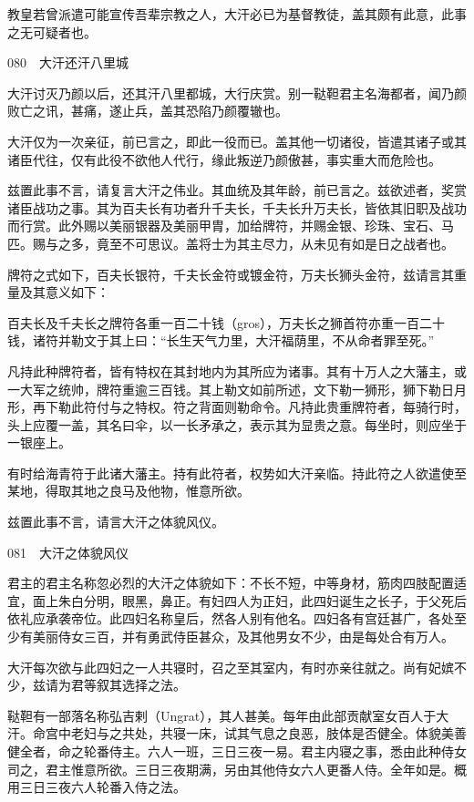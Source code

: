 \documentclass[12pt,UTF8]{ctexbook}
\begin{document}
教皇若曾派遣可能宣传吾辈宗教之人，大汗必已为基督教徒，盖其颇有此意，此事之无可疑者也。





080　大汗还汗八里城

大汗讨灭乃颜以后，还其汗八里都城，大行庆赏。别一鞑靼君主名海都者，闻乃颜败亡之讯，甚痛，遂止兵，盖其恐陷乃颜覆辙也。

大汗仅为一次亲征，前已言之，即此一役而已。盖其他一切诸役，皆遣其诸子或其诸臣代往，仅有此役不欲他人代行，缘此叛逆乃颜傲甚，事实重大而危险也。

兹置此事不言，请复言大汗之伟业。其血统及其年龄，前已言之。兹欲述者，奖赏诸臣战功之事。其为百夫长有功者升千夫长，千夫长升万夫长，皆依其旧职及战功而行赏。此外赐以美丽银器及美丽甲胄，加给牌符，并赐金银、珍珠、宝石、马匹。赐与之多，竟至不可思议。盖将士为其主尽力，从未见有如是日之战者也。

牌符之式如下，百夫长银符，千夫长金符或镀金符，万夫长狮头金符，兹请言其重量及其意义如下：

百夫长及千夫长之牌符各重一百二十钱（gros），万夫长之狮首符亦重一百二十钱，诸符并勒文于其上曰：“长生天气力里，大汗福荫里，不从命者罪至死。”

凡持此种牌符者，皆有特权在其封地内为其所应为诸事。其有十万人之大藩主，或一大军之统帅，牌符重逾三百钱。其上勒文如前所述，文下勒一狮形，狮下勒日月形，再下勒此符付与之特权。符之背面则勒命令。凡持此贵重牌符者，每骑行时，头上应覆一盖，其名曰伞，以一长矛承之，表示其为显贵之意。每坐时，则应坐于一银座上。

有时给海青符于此诸大藩主。持有此符者，权势如大汗亲临。持此符之人欲遣使至某地，得取其地之良马及他物，惟意所欲。

兹置此事不言，请言大汗之体貌风仪。





081　大汗之体貌风仪

君主的君主名称忽必烈的大汗之体貌如下：不长不短，中等身材，筋肉四肢配置适宜，面上朱白分明，眼黑，鼻正。有妇四人为正妇，此四妇诞生之长子，于父死后依礼应承袭帝位。此四妇名称皇后，然各人别有他名。四妇各有宫廷甚广，各处至少有美丽侍女三百，并有勇武侍臣甚众，及其他男女不少，由是每处合有万人。

大汗每次欲与此四妇之一人共寝时，召之至其室内，有时亦亲往就之。尚有妃嫔不少，兹请为君等叙其选择之法。

鞑靼有一部落名称弘吉剌（Ungrat），其人甚美。每年由此部贡献室女百人于大汗。命宫中老妇与之共处，共寝一床，试其气息之良恶，肢体是否健全。体貌美善健全者，命之轮番侍主。六人一班，三日三夜一易。君主内寝之事，悉由此种侍女司之，君主惟意所欲。三日三夜期满，另由其他侍女六人更番人侍。全年如是。概用三日三夜六人轮番入侍之法。
\end{document}
